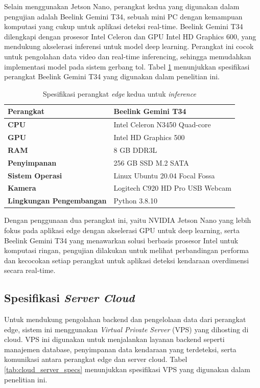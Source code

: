 Selain menggunakan Jetson Nano, perangkat kedua yang digunakan dalam pengujian adalah Beelink Gemini T34, sebuah mini PC dengan kemampuan komputasi yang cukup untuk aplikasi deteksi real-time. Beelink Gemini T34 dilengkapi dengan prosesor Intel Celeron dan GPU Intel HD Graphics 600, yang mendukung akselerasi inferensi untuk model deep learning. Perangkat ini cocok untuk pengolahan data video dan real-time inferencing, sehingga memudahkan implementasi model pada sistem gerbang tol. Tabel \ref{tab:beelink_t34_specs} menunjukkan spesifikasi perangkat Beelink Gemini T34 yang digunakan dalam penelitian ini.

\begin{table}[htbp]
  \centering
  \begin{tabular}{|l|l|}
  \hline
  \textbf{Perangkat} & Beelink Gemini T34 \\
  \hline
  \textbf{CPU} & Intel Celeron N3450 Quad-core \\
  \hline
  \textbf{GPU} & Intel HD Graphics 500 \\
  \hline
  \textbf{RAM} & 8 GB DDR3L \\
  \hline
  \textbf{Penyimpanan} & 256 GB SSD M.2 SATA \\
  \hline
  \textbf{Sistem Operasi} & Linux Ubuntu 20.04 Focal Fossa \\
  \hline
  \textbf{Kamera} & Logitech C920 HD Pro USB Webcam \\
  \hline
  \textbf{Lingkungan Pengembangan} & Python 3.8.10 \\
  \hline
  \end{tabular}
  \caption{Spesifikasi perangkat \emph{edge} kedua untuk \emph{inference}}
  \label{tab:beelink_t34_specs}
\end{table}

Dengan penggunaan dua perangkat ini, yaitu NVIDIA Jetson Nano yang lebih fokus pada aplikasi edge dengan akselerasi GPU untuk deep learning, serta Beelink Gemini T34 yang menawarkan solusi berbasis prosesor Intel untuk komputasi ringan, pengujian dilakukan untuk melihat perbandingan performa dan kecocokan setiap perangkat untuk aplikasi deteksi kendaraan overdimensi secara real-time.

\subsection{Spesifikasi \emph{Server Cloud}}

Untuk mendukung pengolahan backend dan pengelolaan data dari perangkat edge, sistem ini menggunakan \emph{Virtual Private Server} (VPS) yang dihosting di cloud. VPS ini digunakan untuk menjalankan layanan backend seperti manajemen database, penyimpanan data kendaraan yang terdeteksi, serta komunikasi antara perangkat edge dan server cloud. Tabel \ref{tab:cloud_server_specs} menunjukkan spesifikasi VPS yang digunakan dalam penelitian ini.


